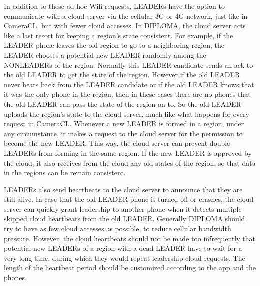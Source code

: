 In addition to these ad-hoc Wifi requests, LEADERs have the option to communicate with a cloud server via the cellular 3G or 4G network, just like in CameraCL, but with fewer cloud accesses. In DIPLOMA, the cloud server acts like a last resort for keeping a region's state consistent. For example, if the LEADER phone leaves the old region to go to a neighboring region, the LEADER chooses a potential new LEADER randomly among the NONLEADERs of the region. Normally this LEADER candidate sends an ack to the old LEADER to get the state of the region. However if the old LEADER never hears back from the LEADER candidate or if the old LEADER knows that it was the only phone in the region, then in these cases there are no phones that the old LEADER can pass the state of the region on to. So the old LEADER uploads the region's state to the cloud server, much like what happens for every request in CameraCL. Whenever a new LEADER is formed in a region, under any circumstance, it makes a request to the cloud server for the permission to become the new LEADER. This way, the cloud server can prevent double LEADERs from forming in the same region. If the new LEADER is approved by the cloud, it also receives from the cloud any old states of the region, so that data in the regions can be remain consistent.

LEADERs also send heartbeats to the cloud server to announce that they are still alive. In case that the old LEADER phone is turned off or crashes, the cloud server can quickly grant leadership to another phone when it detects multiple skipped cloud heartbeats from the old LEADER. Generally DIPLOMA should try to have as few cloud accesses as possible, to reduce cellular bandwidth pressure. However, the cloud heartbeats should not be made too infrequently that potential new LEADERs of a region with a dead LEADER have to wait for a very long time, during which they would repeat leadership cloud requests. The length of the heartbeat period should be customized according to the app and the phones.

